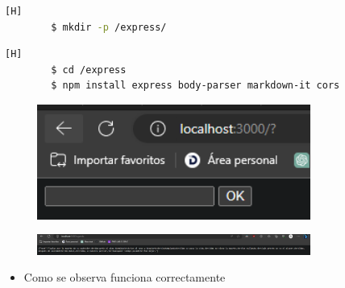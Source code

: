 \documentclass{article}
\begin{document}
	\begin{lstlisting}[language=bash,caption={Crear subcarpeta para instalar frameworks}][H]
		$ mkdir -p /express/
	\end{lstlisting}
	\begin{lstlisting}[language=bash,caption={Instalar frameworks dentro de express}][H]
		$ cd /express
		$ npm install express body-parser markdown-it cors
	\end{lstlisting}	
	
	
	\begin{figure}[H]
		\centering
		\includegraphics[width=0.8\textwidth,keepaspectratio]{img/localhost01.png}
	\end{figure}
	\begin{figure}[H]
		\centering
		\includegraphics[width=0.8\textwidth,keepaspectratio]{img/localhost_agenda.png}
	\end{figure}
	\begin{itemize}	
		\item Como se observa funciona correctamente
	\end{itemize}
\end{document}
